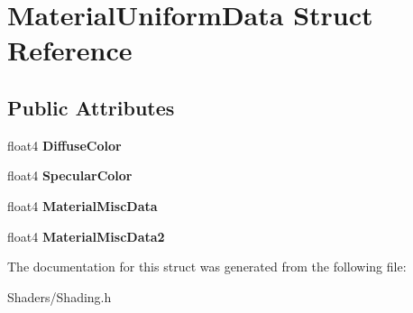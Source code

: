 \hypertarget{structMaterialUniformData}{}\section{Material\+Uniform\+Data Struct Reference}
\label{structMaterialUniformData}
\subsection*{Public Attributes}
\begin{DoxyCompactItemize}
\item 
\mbox{\label{structMaterialUniformData_a22264ede0f1d6febc6bff83e02b31f9e}} 
float4 {\bfseries Diffuse\+Color}
\item 
\mbox{\label{structMaterialUniformData_aeca5bb5074b5546aecffcc6f847c0461}} 
float4 {\bfseries Specular\+Color}
\item 
\mbox{\label{structMaterialUniformData_acbf7cb393d2b1207aad58b03fed6ea85}} 
float4 {\bfseries Material\+Misc\+Data}
\item 
\mbox{\label{structMaterialUniformData_a2e6785f5781aff4b1a2b2ea9aaf91558}} 
float4 {\bfseries Material\+Misc\+Data2}
\end{DoxyCompactItemize}


The documentation for this struct was generated from the following file\+:\begin{DoxyCompactItemize}
\item 
Shaders/Shading.\+h\end{DoxyCompactItemize}
